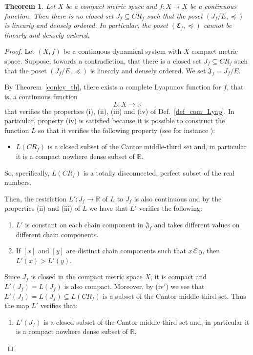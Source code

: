 \documentclass[pdflatex,sn-mathphys-num]{sn-jnl}
\theoremstyle{thmstyleone}%
\newtheorem{thm}{Theorem}
\theoremstyle{thmstyletwo}%
\theoremstyle{thmstylethree}%
\begin{document}
\begin{thm}\label{main}
Let $X$ be a compact metric space and $f:X\to X$ be a continuous function. Then there is no closed set $J_f\subseteq CR_f$ such that the poset $(J_f/E,\preceq)$ is linearly and densely ordered. 
In particular, the poset $(\mathfrak{C}_f,\preceq)$ cannot be linearly and densely ordered.
\end{thm}
\begin{proof}
    Let $(X,f)$ be a continuous dynamical system with $X$ compact metric space.
    Suppose, towards a contradiction, that there is a closed set $J_f\subseteq CR_f$ such that the poset $(J_f/E,\preceq)$ is linearly and densely ordered. 
    We set $\mathfrak{J}_f=J_f/E$.
    
   \noindent By Theorem~\ref{conley_th}, there exists a complete Lyapunov function for $f$, that is, a continuous function
    \[
    L : X\to \mathbb{R}
    \]
    that verifies the properties (i), (ii), (iii) and (iv) of Def.~\ref{def_com_Lyap}. 
    In particular, property (iv) is satisfied because it is possible to construct the function $L$ so that it verifies the following property (see for instance \cite[Theorem 4.9]{norton}):
    \begin{itemize}
    \item[(iv$'$)] $L(CR_f)$ is a closed subset of the Cantor middle-third set and, in particular it is a compact nowhere dense subset of $\mathbb{R}$.
    \end{itemize}
    So, specifically, $L(CR_f)$ is a totally disconnected, perfect subset of the real numbers. 

    \noindent Then, the restriction $L':J_f\to\mathbb{R}$ of $L$ to $J_f$ is also continuous and by the properties (ii) and (iii) of $L$ we have that $L'$ verifies the following:
    \begin{enumerate}
        \item[(1)] $L'$ is constant on each chain component in $\mathfrak{J}_f$ and takes different values on different chain components.
        \item[(2)] If $[x]$ and $[y]$ are distinct chain components such that $x\,\mathcal{C}\, y$, then $L'(x)>L'(y)$.
    \end{enumerate}
    Since $J_f$ is closed in the compact metric space $X$, it is compact and $L'(J_f)=L(J_f)$ is also compact. 
    Moreover, by (iv$'$) we see that $L'(J_f)=L(J_f)\subseteq L(CR_f)$ is a subset of the Cantor middle-third set. Thus the map $L'$ verifies that:
    \begin{enumerate}
        \item[(3)] $L'(J_f)$ is a closed subset of the Cantor middle-third set and, in particular it is a compact nowhere dense subset of $\mathbb{R}$. 
    \end{enumerate}
    

\end{proof}
\end{document}
